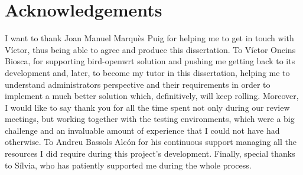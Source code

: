 \chapter*{Acknowledgements}
\thispagestyle{empty}

I want to thank Joan Manuel Marqu\`{e}s Puig for helping me to get in touch with V\'{i}ctor, thus being able to agree and produce this dissertation. To V\'{i}ctor Oncins Biosca, for supporting bird-openwrt solution and pushing me getting back to its development and, later, to become my tutor in this dissertation, helping me to understand administrators perspective and their  requirements in order to implement a much better solution which, definitively, will keep rolling. Moreover, I would like to say thank you for all the time spent not only during our review meetings, but working together with the testing environments, which were a big challenge and an invaluable amount of experience that I could not have had otherwise. To Andreu Bassols Alc\'{o}n for his continuous support managing all the resources I did require during this project's development. Finally, special thanks to S\'{i}lvia, who has patiently supported me during the whole process.
